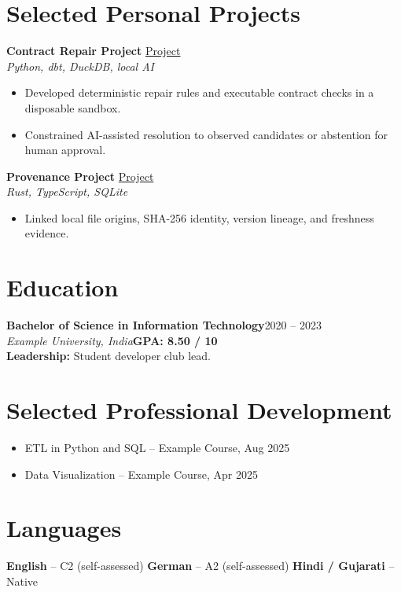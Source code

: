 \documentclass[a4paper,11pt]{article}
\begin{document}
\newpage
\section*{Selected Personal Projects}
\textbf{Contract Repair Project}\hfill
\href{https://example.invalid/project-one}{Project}\\
\textit{Python, dbt, DuckDB, local AI}
\begin{itemize}
  \item Developed deterministic repair rules and executable contract checks in a disposable sandbox.
  \item Constrained AI-assisted resolution to observed candidates or abstention for human approval.
\end{itemize}

\textbf{Provenance Project}\hfill
\href{https://example.invalid/project-two}{Project}\\
\textit{Rust, TypeScript, SQLite}
\begin{itemize}
  \item Linked local file origins, SHA-256 identity, version lineage, and freshness evidence.
\end{itemize}

\section*{Education}
\textbf{Bachelor of Science in Information Technology}\hfill 2020 -- 2023\\
\textit{Example University, India}\hfill\textbf{GPA: 8.50 / 10}\\[3pt]
\textbf{Leadership:} Student developer club lead.

\section*{Selected Professional Development}
\begin{itemize}
  \item ETL in Python and SQL -- Example Course, Aug 2025
  \item Data Visualization -- Example Course, Apr 2025
\end{itemize}

\section*{Languages}
\textbf{English} -- C2 (self-assessed)\enspace\textbar{}\enspace
\textbf{German} -- A2 (self-assessed)\enspace\textbar{}\enspace
\textbf{Hindi / Gujarati} -- Native
\end{document}
